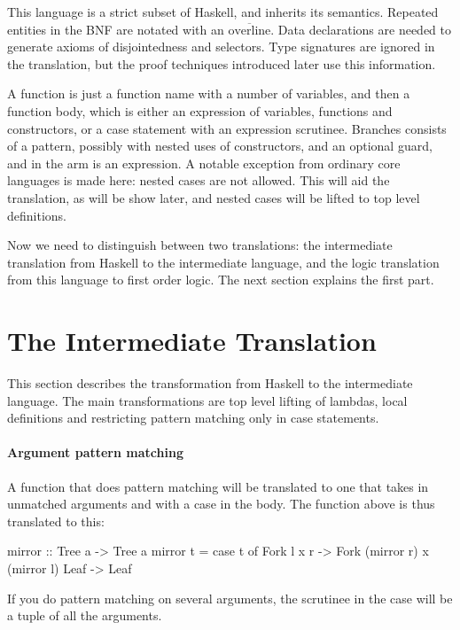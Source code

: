 This language is a strict subset of Haskell, and inherits its
semantics.  Repeated entities in the BNF are notated with an
$\overline{\text{overline}}$.  Data declarations are needed to
generate axioms of disjointedness and selectors. Type signatures are
ignored in the translation, but the proof techniques introduced later
use this information.

A function is just a function name with a number of variables, and
then a function body, which is either an expression of variables,
functions and constructors, or a case statement with an expression
scrutinee. Branches consists of a pattern, possibly with nested uses
of constructors, and an optional guard, and in the arm is an
expression. A notable exception from ordinary core languages is made
here: nested cases are not allowed. This will aid the translation, as
will be show later, and nested cases will be lifted to top level definitions.

Now we need to distinguish between two translations: the intermediate
translation from Haskell to the intermediate language, and the logic
translation from this language to first order logic. The next section
explains the first part.

\pagebreak
\section{The Intermediate Translation}

This section describes the transformation from Haskell to the
intermediate language. The main transformations are top level lifting
of lambdas, local definitions and restricting pattern matching only in
case statements.

\paragraph{Argument pattern matching} A function that does pattern matching will be translated to one that
takes in unmatched arguments and with a case in the body. The
 function above is thus translated to this:

\begin{code}
mirror :: Tree a -> Tree a
mirror t = case t of
   Fork l x r -> Fork (mirror r) x (mirror l)
   Leaf       -> Leaf
\end{code}

\noindent
If you do pattern matching on several arguments, the scrutinee in the
case will be a tuple of all the arguments.

